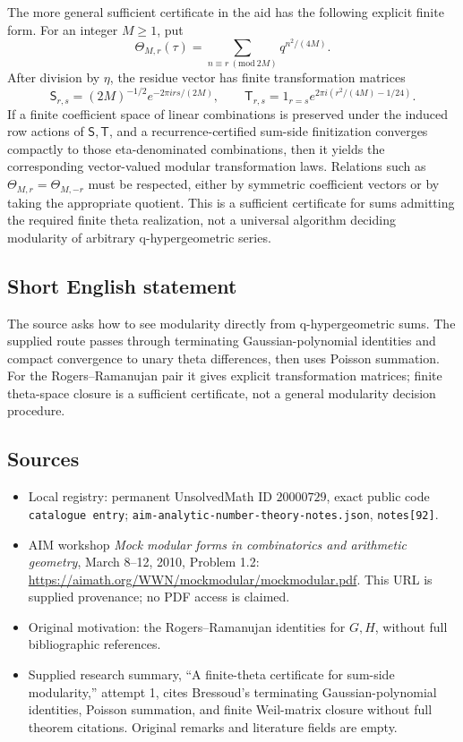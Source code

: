 \documentclass[11pt]{article}
\begin{document}
The more general sufficient certificate in the aid has the following explicit finite form. For an integer \(M\geq1\), put
\[
 \Theta_{M,r}(\tau)=\sum_{n\equiv r\ (\mathrm{mod}\ 2M)}q^{n^2/(4M)}.
\]
After division by \(\eta\), the residue vector has finite transformation matrices
\[
 \mathsf S_{r,s}=(2M)^{-1/2}e^{-2\pi i rs/(2M)},\qquad
 \mathsf T_{r,s}=1_{r=s}e^{2\pi i(r^2/(4M)-1/24)}.
\]
If a finite coefficient space of linear combinations is preserved under the induced row actions of \(\mathsf S,\mathsf T\), and a recurrence-certified sum-side finitization converges compactly to those eta-denominated combinations, then it yields the corresponding vector-valued modular transformation laws. Relations such as \(\Theta_{M,r}=\Theta_{M,-r}\) must be respected, either by symmetric coefficient vectors or by taking the appropriate quotient. This is a sufficient certificate for sums admitting the required finite theta realization, not a universal algorithm deciding modularity of arbitrary q-hypergeometric series.
\subsection{Short English statement}
The source asks how to see modularity directly from q-hypergeometric sums. The supplied route passes through terminating Gaussian-polynomial identities and compact convergence to unary theta differences, then uses Poisson summation. For the Rogers--Ramanujan pair it gives explicit transformation matrices; finite theta-space closure is a sufficient certificate, not a general modularity decision procedure.
\subsection{Sources}
\begin{itemize}
\item Local registry: permanent UnsolvedMath ID \(20000729\), exact public code \texttt{catalogue entry}; \texttt{aim-analytic-number-theory-notes.json}, \texttt{notes[92]}.
\item AIM workshop \emph{Mock modular forms in combinatorics and arithmetic geometry}, March 8--12, 2010, Problem 1.2: \url{https://aimath.org/WWN/mockmodular/mockmodular.pdf}. This URL is supplied provenance; no PDF access is claimed.
\item Original motivation: the Rogers--Ramanujan identities for \(G,H\), without full bibliographic references.
\item Supplied research summary, ``A finite-theta certificate for sum-side modularity,'' attempt 1, cites Bressoud's terminating Gaussian-polynomial identities, Poisson summation, and finite Weil-matrix closure without full theorem citations. Original remarks and literature fields are empty.
\end{itemize}
\end{document}

